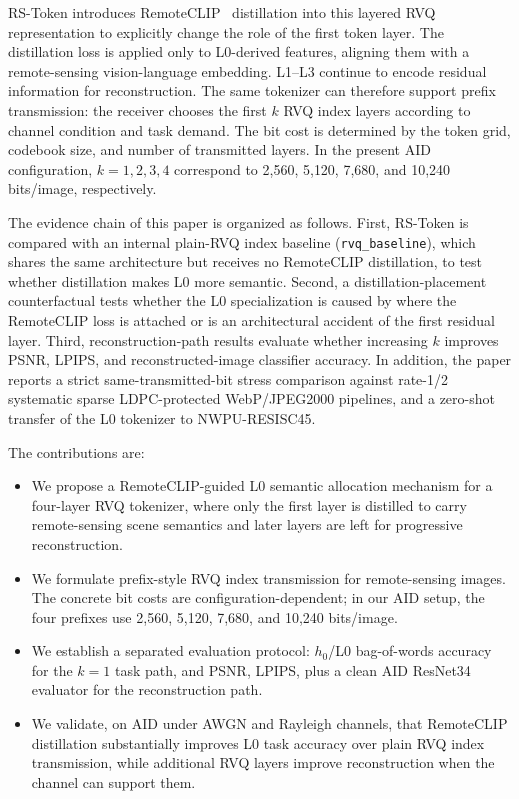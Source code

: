 \documentclass[lettersize,journal]{IEEEtran}
\begin{document}
RS-Token introduces RemoteCLIP~\cite{liu2024remoteclip} distillation into this layered RVQ representation to explicitly change the role of the first token layer. The distillation loss is applied only to L0-derived features, aligning them with a remote-sensing vision-language embedding. L1--L3 continue to encode residual information for reconstruction. The same tokenizer can therefore support prefix transmission: the receiver chooses the first $k$ RVQ index layers according to channel condition and task demand. The bit cost is determined by the token grid, codebook size, and number of transmitted layers. In the present AID configuration, $k=1,2,3,4$ correspond to 2{,}560, 5{,}120, 7{,}680, and 10{,}240 bits/image, respectively.

The evidence chain of this paper is organized as follows. First, RS-Token is compared with an internal plain-RVQ index baseline (\texttt{rvq\_baseline}), which shares the same architecture but receives no RemoteCLIP distillation, to test whether distillation makes L0 more semantic. Second, a distillation-placement counterfactual tests whether the L0 specialization is caused by where the RemoteCLIP loss is attached or is an architectural accident of the first residual layer. Third, reconstruction-path results evaluate whether increasing $k$ improves PSNR, LPIPS, and reconstructed-image classifier accuracy. In addition, the paper reports a strict same-transmitted-bit stress comparison against rate-1/2 systematic sparse LDPC-protected WebP/JPEG2000 pipelines, and a zero-shot transfer of the L0 tokenizer to NWPU-RESISC45.

The contributions are:
\begin{itemize}
    \item We propose a RemoteCLIP-guided L0 semantic allocation mechanism for a four-layer RVQ tokenizer, where only the first layer is distilled to carry remote-sensing scene semantics and later layers are left for progressive reconstruction.
    \item We formulate prefix-style RVQ index transmission for remote-sensing images. The concrete bit costs are configuration-dependent; in our AID setup, the four prefixes use 2{,}560, 5{,}120, 7{,}680, and 10{,}240 bits/image.
    \item We establish a separated evaluation protocol: $h_0$/L0 bag-of-words accuracy for the $k=1$ task path, and PSNR, LPIPS, plus a clean AID ResNet34 evaluator for the reconstruction path.
    \item We validate, on AID under AWGN and Rayleigh channels, that RemoteCLIP distillation substantially improves L0 task accuracy over plain RVQ index transmission, while additional RVQ layers improve reconstruction when the channel can support them.
\end{itemize}
\end{document}
